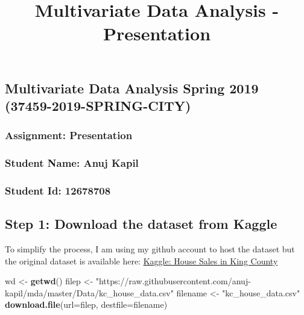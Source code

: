 \documentclass[]{article}
\title{Multivariate Data Analysis - Presentation}
\author{}
\date{}
\newenvironment{Shaded}{\begin{snugshade}}{\end{snugshade}}
\newcommand{\DataTypeTok}[1]{\textcolor[rgb]{0.13,0.29,0.53}{#1}}
\newcommand{\KeywordTok}[1]{\textcolor[rgb]{0.13,0.29,0.53}{\textbf{#1}}}
\newcommand{\NormalTok}[1]{#1}
\newcommand{\StringTok}[1]{\textcolor[rgb]{0.31,0.60,0.02}{#1}}
\begin{document}
\maketitle

\hypertarget{multivariate-data-analysis-spring-2019-37459-2019-spring-city}{%
\subsection{Multivariate Data Analysis Spring 2019
(37459-2019-SPRING-CITY)}\label{multivariate-data-analysis-spring-2019-37459-2019-spring-city}}

\hypertarget{assignment-presentation}{%
\subsubsection{Assignment: Presentation}\label{assignment-presentation}}

\hypertarget{student-name-anuj-kapil}{%
\subsubsection{Student Name: Anuj Kapil}\label{student-name-anuj-kapil}}

\hypertarget{student-id-12678708}{%
\subsubsection{Student Id: 12678708}\label{student-id-12678708}}

\hypertarget{step-1-download-the-dataset-from-kaggle}{%
\subsection{Step 1: Download the dataset from
Kaggle}\label{step-1-download-the-dataset-from-kaggle}}

To simplify the process, I am using my github account to host the
dataset but the original dataset is available here:
\href{https://www.kaggle.com/harlfoxem/housesalesprediction}{Kaggle:
House Sales in King County}

\begin{Shaded}
\begin{Highlighting}[]
\NormalTok{wd <-}\StringTok{ }\KeywordTok{getwd}\NormalTok{()}
\NormalTok{filep <-}\StringTok{ "https://raw.githubusercontent.com/anuj-kapil/mda/master/Data/kc_house_data.csv"}
\NormalTok{filename <-}\StringTok{ "kc_house_data.csv"}
\KeywordTok{download.file}\NormalTok{(}\DataTypeTok{url=}\NormalTok{filep, }\DataTypeTok{destfile=}\NormalTok{filename)}
\end{Highlighting}
\end{Shaded}
\end{document}
